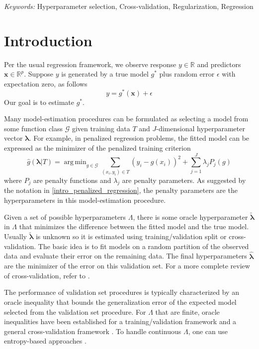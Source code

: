 \documentclass[12pt]{article}
\DeclareMathOperator*{\argmin}{arg\,min}
\begin{document}
\noindent%
{\it Keywords:}  Hyperparameter selection, Cross-validation, Regularization, Regression
\vfill

\newpage
{}
\section{Introduction}

Per the usual regression framework, we observe response $y \in \mathbb{R}$ and predictors $\boldsymbol {x} \in \mathbb{R}^p$. Suppose $y$ is generated by a true model $g^*$ plus random error $\epsilon$ with expectation zero, as follows
\begin{equation}
\label{true_model}
y = g^*(\boldsymbol x) + \epsilon
\end{equation}
Our goal is to estimate $g^*$.

Many model-estimation procedures can be formulated as selecting a model from some function class $\mathcal{G}$ given training data $T$ and $J$-dimensional hyperparameter vector $\boldsymbol{\lambda}$. For example, in penalized regression problems, the fitted model can be expressed as the minimizer of the penalized training criterion
\begin{equation}
\label{intro_penalized_regression}
\hat{g}(\boldsymbol \lambda | T) = \argmin_{g\in \mathcal{G}} \sum_{(x_i, y_i) \in T} \left (y_i -  g(x_i) \right )^2 + \sum_{j=1}^J \lambda_j P_j(g)
\end{equation}
where $P_j$ are penalty functions and $\lambda_j$ are penalty parameters. As suggested by the notation in \eqref{intro_penalized_regression}, the penalty parameters are the hyperparameters in this model-estimation procedure.

Given a set of possible hyperparameters $\Lambda$, there is some oracle hyperparameter $\tilde{\boldsymbol{\lambda}}$ in $\Lambda$ that minimizes the difference between the fitted model and the true model. Usually $\tilde{\boldsymbol{\lambda}}$ is unknown so it is estimated using training/validation split or cross-validation. The basic idea is to fit models on a random partition of the observed data and evaluate their error on the remaining data. The final hyperparameters $\hat{\boldsymbol{\lambda}}$ are the minimizer of the error on this validation set. For a more complete review of cross-validation, refer to \citet{arlot2010survey}.

The performance of validation set procedures is typically characterized by an oracle inequality that bounds the generalization error of the expected model selected from the validation set procedure. For $\Lambda$ that are finite, oracle inequalities have been established for a training/validation framework \citet{gyorfi2006distribution} and a general cross-validation framework \citep{van2003unified, van2004asymptotic}. To handle continuous $\Lambda$, one can use entropy-based approaches \citep{lecue2012oracle}. 
\end{document}

